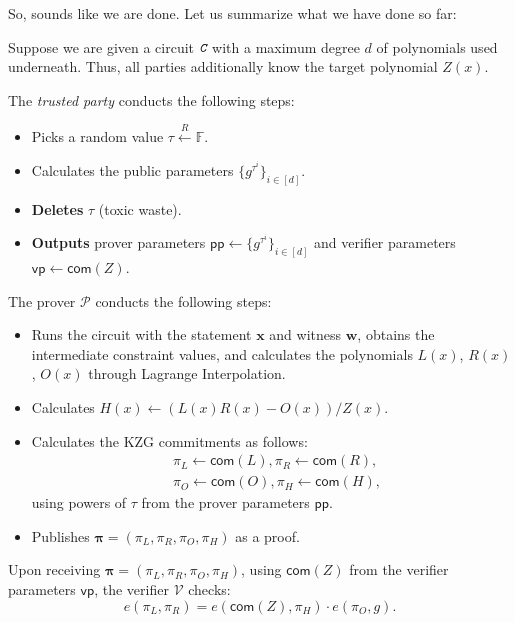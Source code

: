 \documentclass[../lecture-notes.tex]{subfiles}
\begin{document}
So, sounds like we are done. Let us summarize what we have done so far:
\begin{tcolorbox}[breakable, title=Attempt \#1: Non-sound SNARK Protocol,
    colback=blue!5!white,
    colframe=blue!75!black,
    colbacktitle=blue!25!white,
    coltitle=blue!20!black,
    fonttitle=\bfseries,
    boxrule=1.25pt,
    subtitle style={boxrule=0pt,
    colback=blue!20!white,
    colupper=blue!75!gray} ]

    Suppose we are given a circuit $\textit{\texttt{C}}$ with a maximum degree $d$ of polynomials used underneath. Thus, all parties additionally know the target polynomial $Z(x)$.

    The \emph{trusted party} conducts the following steps:
    \begin{itemize}[label=]
        \item Picks a random value $\tau \xleftarrow{R} \mathbb{F}$.
        \item Calculates the public parameters $\{g^{\tau^i}\}_{i \in [d]}$.
        \item \textbf{Deletes} $\tau$ (toxic waste).
        \item \textbf{Outputs} prover parameters $\mathsf{pp} \gets \{g^{\tau^i}\}_{i \in [d]}$ and verifier parameters $\mathsf{vp} \gets \mathsf{com}(Z)$.
    \end{itemize}
    The prover $\mathcal{P}$ conducts the following steps:
    \begin{itemize}[label=]
        \item Runs the circuit with the statement $\mathbf{x}$ and witness $\mathbf{w}$, obtains the intermediate constraint values, and calculates the polynomials $L(x)$, $R(x)$, $O(x)$ through Lagrange Interpolation.
        \item Calculates $H(x) \gets (L(x)R(x) - O(x))\big/ Z(x)$.
        \item Calculates the KZG commitments as follows: 
        \begin{equation*}
            \begin{aligned}
                &\pi_L \gets \mathsf{com}(L), \pi_R \gets \mathsf{com}(R), \\ &\pi_O \gets \mathsf{com}(O), \pi_H \gets \mathsf{com}(H),                
            \end{aligned}
        \end{equation*}
        using powers of $\tau$ from the prover parameters $\mathsf{pp}$.
        \item Publishes $\boldsymbol{\pi} = (\pi_L,\pi_R,\pi_O,\pi_H)$ as a proof.
    \end{itemize}
    Upon receiving $\boldsymbol{\pi} = (\pi_L,\pi_R,\pi_O,\pi_H)$, using $\mathsf{com}(Z)$ from the verifier parameters $\mathsf{vp}$, the verifier $\mathcal{V}$ checks:
    \begin{equation*}
        e(\pi_L, \pi_R) = e(\mathsf{com}(Z), \pi_H) \cdot e(\pi_O, g).
    \end{equation*}
\end{tcolorbox}
\end{document}
